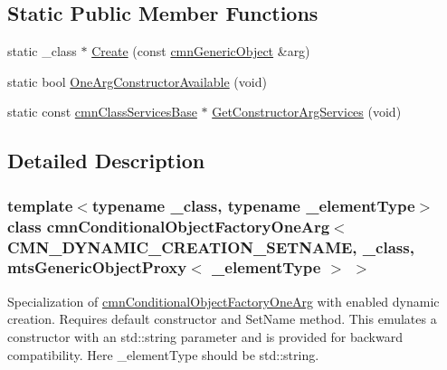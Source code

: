 \subsection*{Static Public Member Functions}
\begin{DoxyCompactItemize}
\item 
static \-\_\-class $\ast$ \hyperlink{classcmn_conditional_object_factory_one_arg_3_01_c_m_n___d_y_n_a_m_i_c___c_r_e_a_t_i_o_n___s_e_tb8b7ba29a3cb16408b71ff50b31fc6ff_af6a477d901a11afc0209da55db37c212}{Create} (const \hyperlink{classcmn_generic_object}{cmn\-Generic\-Object} \&arg)
\item 
static bool \hyperlink{classcmn_conditional_object_factory_one_arg_3_01_c_m_n___d_y_n_a_m_i_c___c_r_e_a_t_i_o_n___s_e_tb8b7ba29a3cb16408b71ff50b31fc6ff_a33480011f4877633d1dbffb476567a11}{One\-Arg\-Constructor\-Available} (void)
\item 
static const \hyperlink{classcmn_class_services_base}{cmn\-Class\-Services\-Base} $\ast$ \hyperlink{classcmn_conditional_object_factory_one_arg_3_01_c_m_n___d_y_n_a_m_i_c___c_r_e_a_t_i_o_n___s_e_tb8b7ba29a3cb16408b71ff50b31fc6ff_a7baf137ad43baf443140dde41653d69e}{Get\-Constructor\-Arg\-Services} (void)
\end{DoxyCompactItemize}


\subsection{Detailed Description}
\subsubsection*{template$<$typename \-\_\-class, typename \-\_\-element\-Type$>$class cmn\-Conditional\-Object\-Factory\-One\-Arg$<$ C\-M\-N\-\_\-\-D\-Y\-N\-A\-M\-I\-C\-\_\-\-C\-R\-E\-A\-T\-I\-O\-N\-\_\-\-S\-E\-T\-N\-A\-M\-E, \-\_\-class, mts\-Generic\-Object\-Proxy$<$ \-\_\-element\-Type $>$ $>$}

Specialization of \hyperlink{classcmn_conditional_object_factory_one_arg}{cmn\-Conditional\-Object\-Factory\-One\-Arg} with enabled dynamic creation. Requires default constructor and Set\-Name method. This emulates a constructor with an std\-::string parameter and is provided for backward compatibility. Here \-\_\-element\-Type should be std\-::string. 

